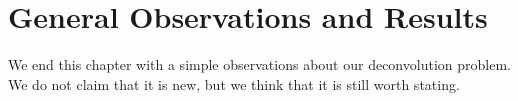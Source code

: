 








	

\section{General Observations and Results}
\label{sec:deconvolution observations and results}

We end this chapter with a simple observations about our deconvolution problem. We do not claim that it is new, but we think that it is still worth stating. 

